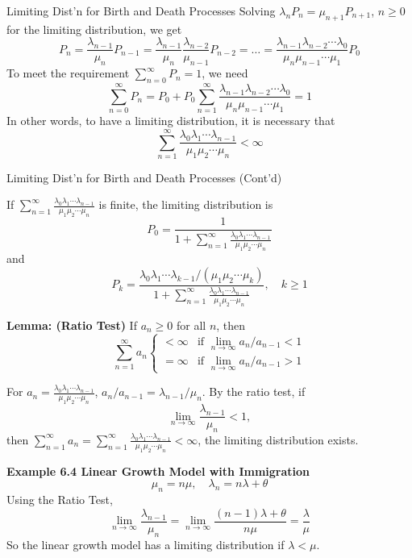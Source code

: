 \documentclass[letterpaper,handout]{beamer}
\begin{document}
\begin{frame}{Limiting Dist'n for Birth and Death Processes}
Solving $\lambda_n P_n= \mu_{n+1}P_{n+1}$, $n\ge 0$ for the limiting distribution, we get
$$
P_n=\frac{\lambda_{n-1}}{\mu_{n}}P_{n-1}=\frac{\lambda_{n-1}}{\mu_{n}}\frac{\lambda_{n-2}}{\mu_{n-1}}P_{n-2}
=\ldots=\frac{\lambda_{n-1}\lambda_{n-2}\cdots\lambda_{0}}{\mu_{n}\mu_{n-1}\cdots\mu_{1}}P_0
$$
To meet the requirement $\sum_{n=0}^{\infty}P_n=1$, we need
$$\sum_{n=0}^{\infty}P_n=P_0+P_0\sum_{n=1}^{\infty}\frac{\lambda_{n-1}\lambda_{n-2}\cdots\lambda_{0}}{\mu_{n}\mu_{n-1}\cdots\mu_{1}}=1$$
In other words, to have a limiting distribution, it is necessary that
$$
\sum_{n=1}^{\infty}\frac{\lambda_{0}\lambda_{1}\cdots\lambda_{n-1}}{\mu_{1}\mu_{2}\cdots\mu_{n}}< \infty
$$
\end{frame}
\begin{frame}{Limiting Dist'n for Birth and Death Processes (Cont'd)}

If $\sum_{n=1}^{\infty}\frac{\lambda_{0}\lambda_{1}\cdots\lambda_{n-1}}{\mu_{1}\mu_{2}\cdots\mu_{n}}$ is finite,
 the limiting distribution is
$$P_0=\frac{1}{1+\sum_{n=1}^{\infty}\frac{\lambda_{0}\lambda_{1}\cdots\lambda_{n-1}}{\mu_{1}\mu_{2}\cdots\mu_{n}}}$$
and
$$P_k=\frac{\lambda_{0}\lambda_{1}\cdots\lambda_{k-1}/(\mu_{1}\mu_{2}\cdots\mu_{k})}{1+\sum_{n=1}^{\infty}\frac{\lambda_{0}\lambda_{1}\cdots\lambda_{n-1}}{\mu_{1}\mu_{2}\cdots\mu_{n}}},\quad k\ge 1$$
\end{frame}


\begin{frame}
\textbf{Lemma: (Ratio Test)}
If $a_n\ge 0$ for all $n$, then
$$
\sum_{n=1}^{\infty}a_n
\begin{cases}
< \infty & \mbox{if } \lim_{n\to\infty}a_n/a_{n-1}<1\\
= \infty & \mbox{if } \lim_{n\to\infty}a_n/a_{n-1}> 1
\end{cases}
$$

For $a_n=\displaystyle{\frac{\lambda_{0}\lambda_{1}\cdots\lambda_{n-1}}{\mu_{1}\mu_{2}\cdots\mu_{n}}}$,
$a_n/a_{n-1}=\lambda_{n-1}/\mu_n$. By the ratio test, if
$$\lim_{n\to\infty}\frac{\lambda_{n-1}}{\mu_n}<1,$$
then $\sum_{n=1}^{\infty}a_n=\sum_{n=1}^{\infty}\frac{\lambda_{0}\lambda_{1}\cdots\lambda_{n-1}}{\mu_{1}\mu_{2}\cdots\mu_{n}}<\infty$, the limiting distribution exists.

\textbf{Example 6.4 Linear Growth Model with Immigration}
$$\mu_n=n\mu,\quad \lambda_n=n\lambda+\theta$$
Using the Ratio Test,
$$
\lim_{n\to\infty}\frac{\lambda_{n-1}}{\mu_n}=\lim_{n\to\infty}\frac{(n-1)\lambda+\theta}{n\mu}=\frac{\lambda}{\mu}
$$
So the linear growth model has a limiting distribution if $\lambda<\mu.$
\end{frame}
\end{document}
